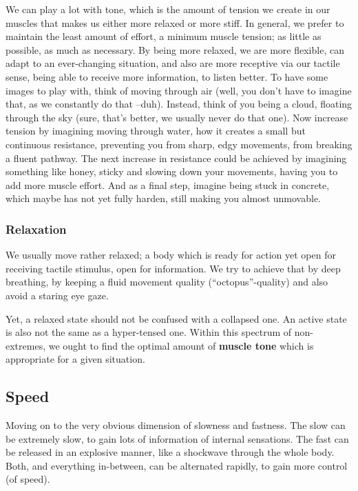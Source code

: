 We can play a lot with tone, which is the amount of tension we create in our muscles that makes us either more relaxed or more stiff.
In general, we prefer to maintain the least amount of effort, a minimum muscle tension; as little as possible, as much as necessary.
By being more relaxed, we are more flexible, can adapt to an ever-changing situation, and also are more receptive via our tactile sense, being able to receive more information, to listen better.
To have some images to play with, think of moving through air (well, you don't have to imagine that, as we constantly do that --duh).
Instead, think of you being a cloud, floating through the sky (sure, that's better, we usually never do that one).
Now increase tension by imagining moving through water, how it creates a small but continuous resistance, preventing you from sharp, edgy movements, from breaking a fluent pathway.
The next increase in resistance could be achieved by imagining something like honey, sticky and slowing down your movements, having you to add more muscle effort.
And as a final step, imagine being stuck in concrete, which maybe has not yet fully harden, still making you almost unmovable.

\subsubsection{Relaxation}

We usually move rather relaxed; a body which is ready for action yet open for receiving tactile stimulus, open for information.
We try to achieve that by deep breathing, by keeping a fluid movement quality (``octopus''-quality) and also avoid a staring eye gaze.

Yet, a relaxed state should not be confused with a collapsed one.
An active state is also not the same as a hyper-tensed one.
Within this spectrum of non-extremes, we ought to find the optimal amount of \textbf{muscle tone} which is appropriate for a given situation.


\subsection{Speed}\label{subsec:speed}

Moving on to the very obvious dimension of slowness and fastness.
The slow can be extremely slow, to gain lots of information of internal sensations.
The fast can be released in an explosive manner, like a shockwave through the whole body.
Both, and everything in-between, can be alternated rapidly, to gain more control (of speed).

